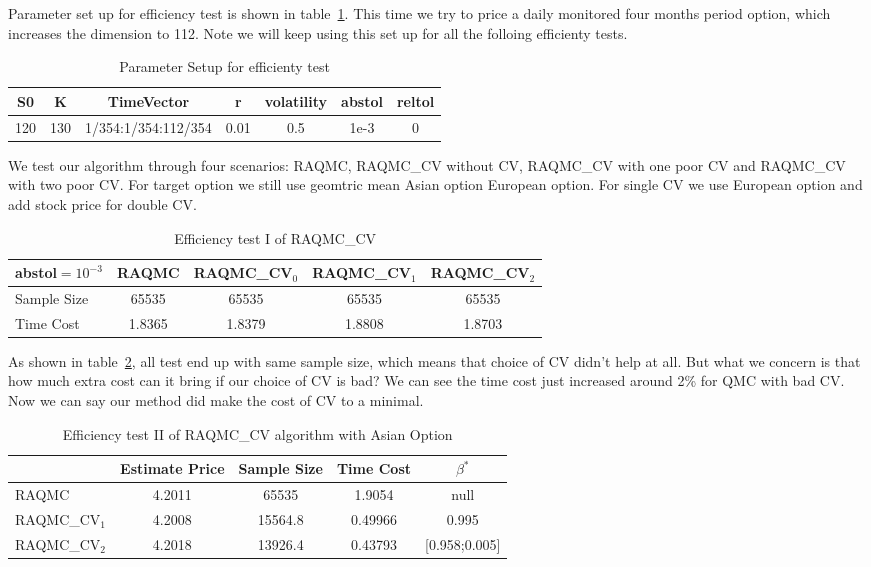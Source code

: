 Parameter set up for efficiency test is shown in table~\ref{tb:effsetup}. 
This time we try to price a daily monitored four months period option, which increases the dimension to 112. 
Note we will keep using this set up for all the folloing efficienty tests. 
\begin{table}[h]
    \centering
	\caption{Parameter Setup for efficienty test}
    \label{tb:effsetup}
	\begin{tabular}{ccccccc}
		\hline\hline
        S0 & K & TimeVector & r & volatility & abstol & reltol \\[0.5ex]
        \hline
        120  & 130 & 1/354:1/354:112/354 & 0.01 & 0.5 & 1e-3 & 0\\[1ex] 
        \hline
	\end{tabular}
\end{table}
We test our algorithm through four scenarios: RAQMC, RAQMC\_CV without CV, RAQMC\_CV with one poor CV and RAQMC\_CV with two poor CV. 
For target option we still use geomtric mean Asian option European option. For single CV we use European option and add stock price for double CV. 
\begin{table}[h]
    \centering
	\caption{Efficiency test I of RAQMC\_CV}
    \label{tb:efftest1}
    \begin{tabular}{lcccc}  
    \hline\hline
    \hline
    abstol$=10^{-3}$&RAQMC&RAQMC\_CV$_0$&RAQMC\_CV$_1$& RAQMC\_CV$_2$\\[0.5ex]
    \hline
    Sample Size	&65535&65535&65535&65535\\[1ex]
    Time Cost &1.8365&1.8379 &1.8808 &1.8703\\[1ex]
   \hline
	\end{tabular}
\end{table}
As shown in table~\ref{tb:efftest1}, all test end up with same sample size, which means that choice of CV didn't help at all. 
But what we concern is that how much extra cost can it bring if our choice of CV is bad? We can see the time cost just increased around 2\% for QMC with bad CV. Now we can say our method did make the cost of CV to a minimal.  


\begin{table}[h]
    \centering
    \label{tb:efftest2a}
	\caption{Efficiency test II of RAQMC\_CV algorithm with Asian Option}
    \begin{tabular}{lcccc}  
    \hline\hline
    &Estimate Price&Sample Size&Time Cost&$\beta^*$\\[0.5ex]
    \hline
    RAQMC& 4.2011&65535 & 1.9054 & null\\[1ex]
    RAQMC\_CV$_1$&4.2008& 15564.8 & 0.49966& 0.995 \\[1ex]
    RAQMC\_CV$_2$&4.2018& 13926.4 & 0.43793& [0.958;0.005]\\[1ex]
    \hline
	\end{tabular}
\end{table}

